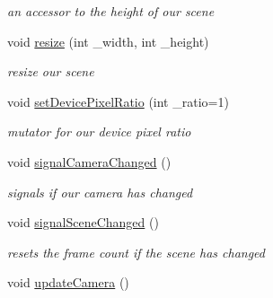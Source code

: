 \begin{DoxyCompactItemize}
\begin{DoxyCompactList}\small\item\em an accessor to the height of our scene \end{DoxyCompactList}\item 
\hypertarget{class_path_tracer_scene_ade7933e8e00e39892797a0ef5a138abf}{void \hyperlink{class_path_tracer_scene_ade7933e8e00e39892797a0ef5a138abf}{resize} (int \-\_\-width, int \-\_\-height)}\label{class_path_tracer_scene_ade7933e8e00e39892797a0ef5a138abf}

\begin{DoxyCompactList}\small\item\em resize our scene \end{DoxyCompactList}\item 
\hypertarget{class_path_tracer_scene_ab2ac93bea8d8aea5accdd47e9a7a4c0c}{void \hyperlink{class_path_tracer_scene_ab2ac93bea8d8aea5accdd47e9a7a4c0c}{set\-Device\-Pixel\-Ratio} (int \-\_\-ratio=1)}\label{class_path_tracer_scene_ab2ac93bea8d8aea5accdd47e9a7a4c0c}

\begin{DoxyCompactList}\small\item\em mutator for our device pixel ratio \end{DoxyCompactList}\item 
\hypertarget{class_path_tracer_scene_a0683e08cf7fd1aa498fc186311e52230}{void \hyperlink{class_path_tracer_scene_a0683e08cf7fd1aa498fc186311e52230}{signal\-Camera\-Changed} ()}\label{class_path_tracer_scene_a0683e08cf7fd1aa498fc186311e52230}

\begin{DoxyCompactList}\small\item\em signals if our camera has changed \end{DoxyCompactList}\item 
\hypertarget{class_path_tracer_scene_a14887fe3324d2f6c0fb7bf32c6f8d3b3}{void \hyperlink{class_path_tracer_scene_a14887fe3324d2f6c0fb7bf32c6f8d3b3}{signal\-Scene\-Changed} ()}\label{class_path_tracer_scene_a14887fe3324d2f6c0fb7bf32c6f8d3b3}

\begin{DoxyCompactList}\small\item\em resets the frame count if the scene has changed \end{DoxyCompactList}\item 
\hypertarget{class_path_tracer_scene_abc185fb2c0cd40aa439437c41109cb12}{void \hyperlink{class_path_tracer_scene_abc185fb2c0cd40aa439437c41109cb12}{update\-Camera} ()}\label{class_path_tracer_scene_abc185fb2c0cd40aa439437c41109cb12}


\end{DoxyCompactItemize}
